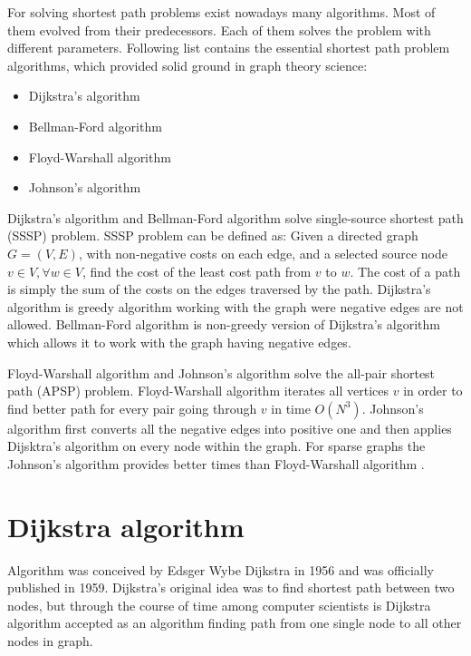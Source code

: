 \documentclass[thesis=M,english]{FITthesis}[2012/10/20]
\begin{document}
For solving shortest path problems exist nowadays many algorithms. Most of them evolved from their predecessors. Each of them solves the problem with different parameters. 
Following list contains the essential shortest path problem algorithms, which provided solid ground in graph theory science:
\begin{itemize}
\item Dijkstra's algorithm
\item Bellman-Ford algorithm
\item Floyd-Warshall algorithm
\item Johnson's algorithm 
\end{itemize}

Dijkstra's algorithm \cite{Dijkstra59} and Bellman-Ford algorithm \cite{Bellman58, FordFulkerson62} solve single-source shortest path (SSSP) problem. SSSP problem can be defined as: Given a directed graph $G = (V,E)$, with non-negative costs on each edge, and a selected source node $v \in V, \forall w \in V$, find the cost of the least cost path from $v$ to $w$. The cost of a path is simply the sum of the costs on the edges traversed by the path. Dijkstra's algorithm is greedy algorithm working with the graph were negative edges are not allowed. Bellman-Ford algorithm is non-greedy version of Dijkstra's algorithm which allows it to work with the graph having negative edges.

Floyd-Warshall algorithm \cite{Warshall62, Floyd56} and Johnson's algorithm \cite{Johnson77} solve the all-pair shortest path (APSP) problem. Floyd-Warshall algorithm iterates all vertices $v$ in order to find better path for every pair going through $v$ in time $O(N^3)$. Johnson's algorithm first converts all the negative edges into positive one and then applies Dijsktra's algorithm on every node within the graph. 
For sparse graphs the Johnson's algorithm provides better times than Floyd-Warshall algorithm \cite{Cormen01}.

\section{Dijkstra algorithm}
Algorithm was conceived by Edsger Wybe Dijkstra in 1956 and was officially published in 1959. Dijkstra's original idea was to find shortest path between two nodes, but through the course of time among computer scientists is Dijkstra algorithm accepted as an algorithm finding path from one single node to all other nodes in graph. 
\end{document}
